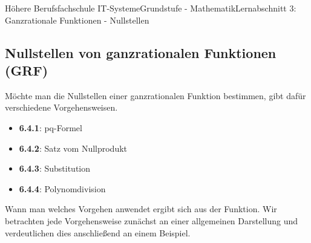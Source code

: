 \documentclass[11pt,twocolumn,oneside,openany,headings=optiontotoc,11pt,numbers=noenddot]{article}
\begin{document}
\begin{worksheet}{Höhere Berufsfachschule IT-Systeme}{Grundstufe - Mathematik}{Lernabschnitt 3: Ganzrationale Funktionen - Nullstellen}
		\subsection{Nullstellen von ganzrationalen Funktionen (GRF)}
		Möchte man die Nullstellen einer ganzrationalen Funktion bestimmen, gibt dafür verschiedene Vorgehensweisen.
		\begin{itemize}
			\item[] \textbf{6.4.1}: pq-Formel
			\item[] \textbf{6.4.2}: Satz vom Nullprodukt
			\item[] \textbf{6.4.3}: Substitution
			\item[] \textbf{6.4.4}: Polynomdivision
		\end{itemize}
		Wann man welches Vorgehen anwendet ergibt sich aus der Funktion. Wir betrachten jede Vorgehensweise zunächst an einer allgemeinen Darstellung und verdeutlichen dies anschließend an einem Beispiel.

\end{worksheet}
\end{document}
